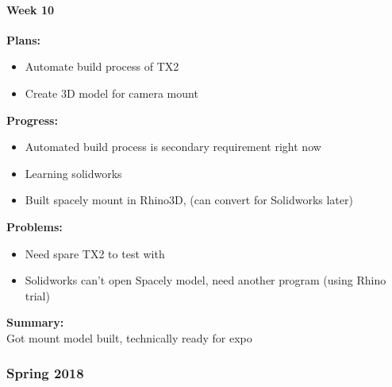 \paragraph{Week 10}
\begin{adjustwidth}{2.5em}{0pt}
    \vspace{-0.5cm}\textbf{Plans:}
    \vspace{-0.5cm}
    \begin{itemize}
        \item Automate build process of TX2
        \item Create 3D model for camera mount
    \end{itemize} 
    \vspace{-0.3cm}\textbf{Progress:}
    \vspace{-0.5cm}
    \begin{itemize}
        \item Automated build process is secondary requirement right now
        \item Learning solidworks
        \item Built spacely mount in Rhino3D, (can convert for Solidworks later)
    \end{itemize} 
    \vspace{-0.3cm}\textbf{Problems:}
    \vspace{-0.5cm}
    \begin{itemize}
        \item Need spare TX2 to test with
        \item Solidworks can't open Spacely model, need another program (using Rhino trial)
    \end{itemize}  
    \vspace{-0.3cm}\noindent\textbf{Summary:}\\
    \noindent 
    Got mount model built, technically ready for expo
\end{adjustwidth}

\subsubsection{Spring 2018}

